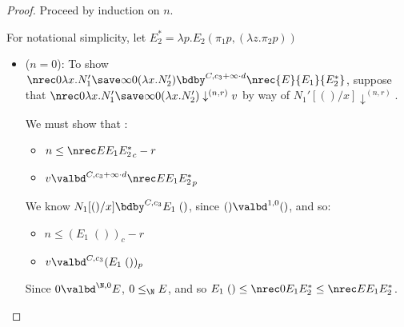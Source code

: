 \nreclemma*
\begin{proof}
Proceed by induction on $n$.

For notational simplicity, let $E_2^* = \lambda p. E_2 (\pi_1 p,(\lambda z. \pi_2 p))$

\begin{itemize}
  \item ($n = 0$): To show $\nrec 0 {\lambda x.N_1'} {\save \infty 0 {(\lambda x.N_2')}} \bdby^{C,c_3 + \infty \cdot d} \nrec {E} {E_1} {E_2^*}$, suppose that $\nrec 0 {\lambda x.N_1'} {\save \infty 0 {(\lambda x.N_2')}} \downarrow^{(n,r)} v$ by way of $N_1'[()/x] \downarrow^{(n,r)}$.
  
  We must show that :
  \begin{itemize}
    \item $n \leq \nrec E {E_1} {E_2^*}_c - r$
    \item $v \valbd^{C,c_3 + \infty \cdot d} \nrec E {E_1} {E_2^*}_p$
  \end{itemize}
  We know $N_1[()/x] \bdby^{C,c_3} E_1 \; ()$, since $() \valbd^{1,0} ()$, and so:
  \begin{itemize}
    \item $n \leq (E_1 \; ())_c - r$
    \item $v \valbd^{C,c_3} (E_1 \; ())_p$
  \end{itemize}
  
  Since $0 \valbd^{\N,0} E$, $0 \leq_\N E$, and so $E_1 \; () \leq \nrec 0 {E_1} {E_2^*} \leq \nrec E {E_1} {E_2^*}$.
  

\end{itemize}
\end{proof}
